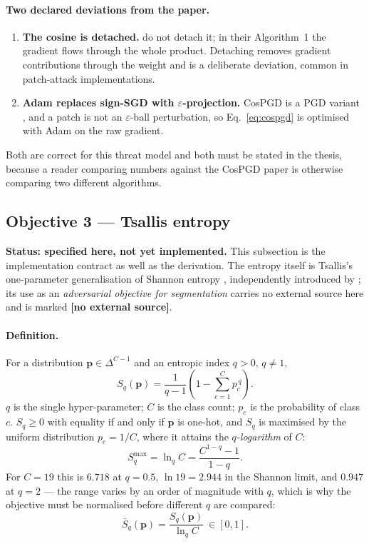 \documentclass[11pt,a4paper]{article}
\newcommand{\novel}{\textbf{[no external source]}}
\begin{document}
\paragraph{Two declared deviations from the paper.}
\begin{enumerate}
\item \textbf{The cosine is detached.} \citet{agnihotri2024cospgd} do not
  detach it; in their Algorithm~1 the gradient flows through the whole
  product. Detaching removes gradient contributions through the weight and
  is a deliberate deviation, common in patch-attack implementations.
\item \textbf{Adam replaces sign-SGD with $\varepsilon$-projection.} CosPGD
  is a PGD variant \citep{madry2018pgd}, and a patch is not an
  $\varepsilon$-ball perturbation, so Eq.~\eqref{eq:cospgd} is optimised
  with Adam on the raw gradient.
\end{enumerate}
Both are correct for this threat model and both must be stated in the
thesis, because a reader comparing numbers against the CosPGD paper is
otherwise comparing two different algorithms.

\subsection{Objective 3 --- Tsallis entropy}
\label{sec:tsallis}

\textbf{Status: specified here, not yet implemented.} This subsection is the
implementation contract as well as the derivation. The entropy itself is
Tsallis's \citeyearpar{tsallis1988} one-parameter generalisation of Shannon
entropy \citep{shannon1948}, independently introduced by
\citet{havrda1967}; its use as an \emph{adversarial objective for
segmentation} carries no external source here and is marked \novel{}.

\paragraph{Definition.}
For a distribution $\mathbf{p}\in\Delta^{C-1}$ and an entropic index
$q>0$, $q\neq1$,
\begin{equation}
  S_q(\mathbf{p}) = \frac{1}{q-1}\left(1-\sum_{c=1}^{C}p_c^{\,q}\right).
  \label{eq:tsallis}
\end{equation}
$q$ is the single hyper-parameter; $C$ is the class count; $p_c$ is the
probability of class $c$. $S_q\ge0$ with equality if and only if
$\mathbf{p}$ is one-hot, and $S_q$ is maximised by the uniform distribution
$p_c=1/C$, where it attains the \emph{$q$-logarithm} of $C$:
\begin{equation}
  S_q^{\max} = \ln_q C = \frac{C^{1-q}-1}{1-q} .
  \label{eq:lnq}
\end{equation}
For $C=19$ this is $6.718$ at $q=0.5$, $\ln 19=2.944$ in the Shannon limit,
and $0.947$ at $q=2$ --- the range varies by an order of magnitude with $q$,
which is why the objective must be normalised before different $q$ are
compared:
\begin{equation}
  \bar S_q(\mathbf{p}) = \frac{S_q(\mathbf{p})}{\ln_q C}\ \in[0,1].
  \label{eq:tsallisnorm}
\end{equation}
\end{document}
